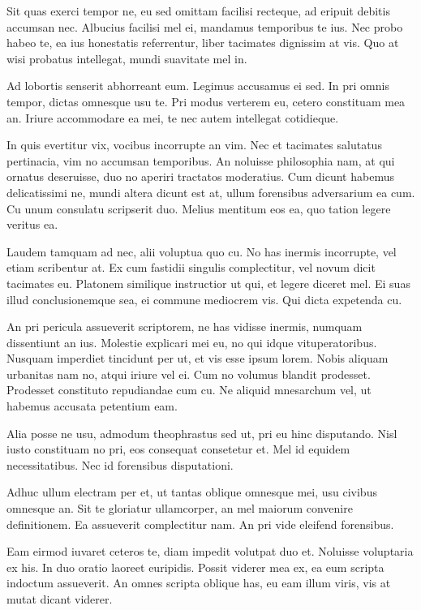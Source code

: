 \documentclass{adhsernotes}
\begin{document}
Sit quas exerci tempor ne, eu sed omittam facilisi recteque, ad eripuit debitis
accumsan nec. Albucius facilisi mel ei, mandamus temporibus te ius. Nec probo
habeo te, ea ius honestatis referrentur, liber tacimates dignissim at vis. Quo
at wisi probatus intellegat, mundi suavitate mel in.

Ad lobortis senserit abhorreant eum. Legimus accusamus ei sed. In pri omnis
tempor, dictas omnesque usu te. Pri modus verterem eu, cetero constituam mea
an. Iriure accommodare ea mei, te nec autem intellegat cotidieque.

In quis evertitur vix, vocibus incorrupte an vim. Nec et tacimates salutatus
pertinacia, vim no accumsan temporibus. An noluisse philosophia nam, at qui
ornatus deseruisse, duo no aperiri tractatos moderatius. Cum dicunt habemus
delicatissimi ne, mundi altera dicunt est at, ullum forensibus adversarium ea
cum. Cu unum consulatu scripserit duo. Melius mentitum eos ea, quo tation legere
veritus ea.

Laudem tamquam ad nec, alii voluptua quo cu. No has inermis incorrupte, vel
etiam scribentur at. Ex cum fastidii singulis complectitur, vel novum dicit
tacimates eu. Platonem similique instructior ut qui, et legere diceret mel. Ei
suas illud conclusionemque sea, ei commune mediocrem vis. Qui dicta expetenda
cu.

An pri pericula assueverit scriptorem, ne has vidisse inermis, numquam
dissentiunt an ius. Molestie explicari mei eu, no qui idque
vituperatoribus. Nusquam imperdiet tincidunt per ut, et vis esse ipsum
lorem. Nobis aliquam urbanitas nam no, atqui iriure vel ei. Cum no volumus
blandit prodesset. Prodesset constituto repudiandae cum cu. Ne aliquid
mnesarchum vel, ut habemus accusata petentium eam.

Alia posse ne usu, admodum theophrastus sed ut, pri eu hinc disputando. Nisl
iusto constituam no pri, eos consequat consetetur et. Mel id equidem
necessitatibus. Nec id forensibus disputationi.

Adhuc ullum electram per et, ut tantas oblique omnesque mei, usu civibus
omnesque an. Sit te gloriatur ullamcorper, an mel maiorum convenire
definitionem. Ea assueverit complectitur nam. An pri vide eleifend forensibus.

Eam eirmod iuvaret ceteros te, diam impedit volutpat duo et. Noluisse voluptaria
ex his. In duo oratio laoreet euripidis. Possit viderer mea ex, ea eum scripta
indoctum assueverit. An omnes scripta oblique has, eu eam illum viris, vis at
mutat dicant viderer.
\end{document}

